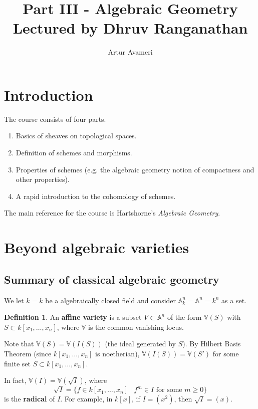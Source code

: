 \documentclass{article}
\title{Part III - Algebraic Geometry
    \\ \large
    Lectured by Dhruv Ranganathan 
}
\author{Artur Avameri}
\date{}
\theoremstyle{definition}
\newtheorem{defn}{Definition}[section]
\begin{document}
\maketitle
\tableofcontents
\newpage
 
\section{Introduction}

The course consists of four parts.
\begin{enumerate}[(1)]
    \item Basics of sheaves on topological spaces.
    \item Definition of schemes and morphisms.
    \item Properties of schemes (e.g. the algebraic geometry notion of compactness and other properties).
    \item A rapid introduction to the cohomology of schemes.
\end{enumerate}

The main reference for the course is Hartshorne's \textit{Algebraic Geometry}.

\section{Beyond algebraic varieties}
\subsection{Summary of classical algebraic geometry}
We let $k = \overline{k}$ be a algebraically closed field and consider $\mathbb{A}_k^n = \mathbb{A}^n = k^n$ as a set.

\begin{defn}
    An \textbf{affine variety} is a subset $V \subset \mathbb{A}^n$ of the form $\mathbb{V}(S)$ with $S \subset k[x_1,\ldots,x_n]$, where $\mathbb{V}$ is the common vanishing locus.
\end{defn}
Note that $\mathbb{V}(S) = \mathbb{V}(I(S))$ (the ideal generated by $S$). By Hilbert Basis Theorem (since $k[x_1,\ldots,x_n]$ is noetherian), $\mathbb{V}(I(S)) = \mathbb{V}(S')$ for some finite set $S \subset k[x_1,\ldots,x_n]$.
\vspace{1mm}
 
In fact, $\mathbb{V}(I) = \mathbb{V}(\sqrt{I})$, where \[
\sqrt{I} = \{ f \in k[x_1,\ldots,x_n] \mid f^m \in I \text{ for some } m\ge 0\}
\] 
is the \textbf{radical} of $I$.
For example, in $k[x]$, if $I = (x^2)$, then $\sqrt{I} = (x)$.
\end{document}
